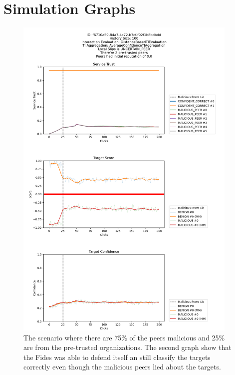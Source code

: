 \appendix
\chapter{Simulation Graphs}

\begin{figure}
    \centering
    \includegraphics[width=0.95\textwidth]{assets/best_worst_case}
    \caption{The scenario where there are 75\% of the peers malicious and 25\% are from the pre-trusted organizations. The second graph show that the Fides was able to defend itself an still classify the targets correctly even though the malicious peers lied about the targets.}
    \label{fig:worst-best-scenario}
\end{figure}

